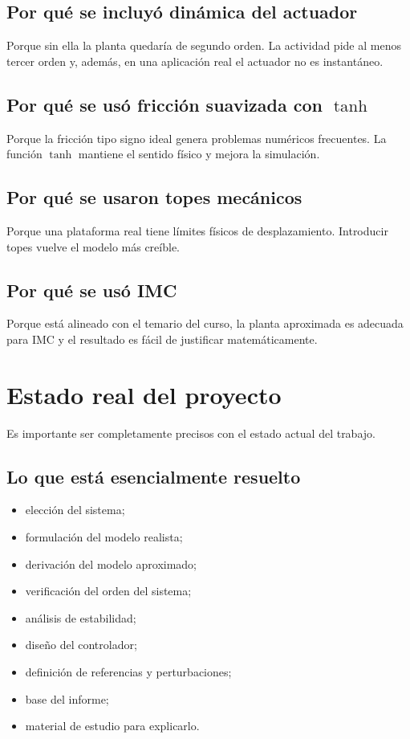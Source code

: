 \documentclass[11pt]{article}
\begin{document}
\subsection*{Por qu\'e se incluy\'o din\'amica del actuador}

Porque sin ella la planta quedar\'ia de segundo orden. La actividad pide al menos tercer orden y, adem\'as, en una aplicaci\'on real el actuador no es instant\'aneo.

\subsection*{Por qu\'e se us\'o fricci\'on suavizada con $\tanh$}

Porque la fricci\'on tipo signo ideal genera problemas num\'ericos frecuentes. La funci\'on $\tanh$ mantiene el sentido f\'isico y mejora la simulaci\'on.

\subsection*{Por qu\'e se usaron topes mec\'anicos}

Porque una plataforma real tiene l\'imites f\'isicos de desplazamiento. Introducir topes vuelve el modelo m\'as cre\'ible.

\subsection*{Por qu\'e se us\'o IMC}

Porque est\'a alineado con el temario del curso, la planta aproximada es adecuada para IMC y el resultado es f\'acil de justificar matem\'aticamente.

\section{Estado real del proyecto}

Es importante ser completamente precisos con el estado actual del trabajo.

\subsection{Lo que est\'a esencialmente resuelto}

\begin{itemize}[leftmargin=1.2cm]
\item elecci\'on del sistema;
\item formulaci\'on del modelo realista;
\item derivaci\'on del modelo aproximado;
\item verificaci\'on del orden del sistema;
\item an\'alisis de estabilidad;
\item dise\~no del controlador;
\item definici\'on de referencias y perturbaciones;
\item base del informe;
\item material de estudio para explicarlo.
\end{itemize}
\end{document}
